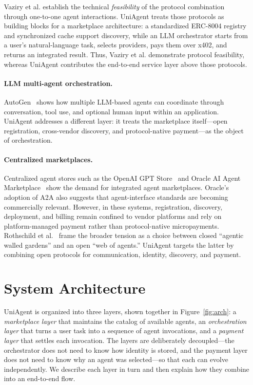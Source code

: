 \documentclass[sigconf]{acmart}
\begin{document}
Vaziry et al. establish the technical \emph{feasibility} of the
protocol combination through one-to-one agent interactions. UniAgent
treats those protocols as building blocks for a marketplace
architecture: a standardized ERC-8004 registry and synchronized cache
support discovery, while an LLM orchestrator starts from a user's
natural-language task, selects providers, pays them over x402, and
returns an integrated result. Thus, Vaziry et al. demonstrate protocol
feasibility, whereas UniAgent contributes the end-to-end service layer
above those protocols.

\paragraph{LLM multi-agent orchestration.}
AutoGen~\cite{wu2023autogen} shows how multiple LLM-based agents can
coordinate through conversation, tool use, and optional human input
within an application. UniAgent addresses a different layer: it treats
the marketplace itself---open registration, cross-vendor discovery, and
protocol-native payment---as the object of orchestration.

\paragraph{Centralized marketplaces.}
Centralized agent stores such as the OpenAI GPT Store~\cite{gptstore}
and Oracle AI Agent Marketplace~\cite{oracleAgentMarketplace2025} show
the demand for integrated agent marketplaces. Oracle's adoption of A2A
also suggests that agent-interface standards are becoming commercially
relevant. However, in these systems, registration, discovery,
deployment, and billing remain confined to vendor platforms and rely on
platform-managed payment rather than protocol-native micropayments.
Rothschild et al.~\cite{rothschild2025agentic} frame the broader tension as a choice
between closed ``agentic walled gardens'' and an open ``web of agents.''
UniAgent targets the latter by combining open protocols for
communication, identity, discovery, and payment.

\section{System Architecture}
\label{sec:architecture}

UniAgent is organized into three layers, shown together in
Figure~\ref{fig:arch}: a \emph{marketplace layer} that maintains the
catalog of available agents, an \emph{orchestration layer} that turns a
user task into a sequence of agent invocations, and a \emph{payment
layer} that settles each invocation. The layers are deliberately
decoupled---the orchestrator does not need to know how identity is
stored, and the payment layer does not need to know why an agent was
selected---so that each can evolve independently. We describe each layer
in turn and then explain how they combine into an end-to-end flow.
\end{document}

